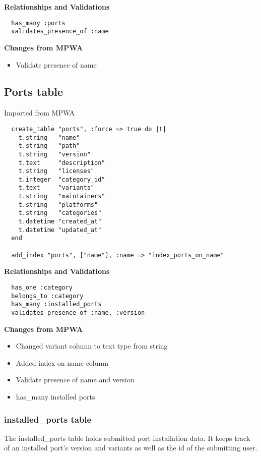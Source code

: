 \documentclass[10pt]{article}
\begin{document}
\textbf{Relationships and Validations}

\begin{verbatim}
  has_many :ports
  validates_presence_of :name
\end{verbatim}

\textbf{Changes from MPWA}
\begin{itemize}
  \item Validate presence of name
\end{itemize}

\subsection{Ports table}

Imported from MPWA

\begin{verbatim}
  create_table "ports", :force => true do |t|
    t.string   "name"
    t.string   "path"
    t.string   "version"
    t.text     "description"
    t.string   "licenses"
    t.integer  "category_id"
    t.text     "variants"
    t.string   "maintainers"
    t.string   "platforms"
    t.string   "categories"
    t.datetime "created_at"
    t.datetime "updated_at"
  end

  add_index "ports", ["name"], :name => "index_ports_on_name"
\end{verbatim}

\textbf{Relationships and Validations}
  
\begin{verbatim}
  has_one :category
  belongs_to :category
  has_many :installed_ports
  validates_presence_of :name, :version
\end{verbatim}

\textbf{Changes from MPWA}
\begin{itemize}
  \item Changed variant column to text type from string
  \item Added index on name column
  \item Validate presence of name and version
  \item has\_many installed ports
\end{itemize}

\subsubsection{installed\_ports table}

The installed\_ports table holds submitted port installation data. It keeps track of an installed port's version and variants as well as the id of the submitting user.
\end{document}

